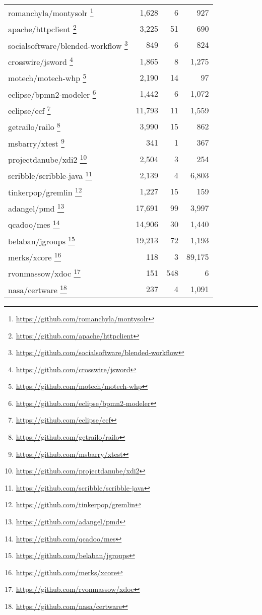 \documentclass[3p]{elsarticle}
\begin{document}
\begin{table}[h]
\begin{tabular}{|l|r|r|r|}
romanchyla/montysolr	 \footnote{\url{https://github.com/romanchyla/montysolr}} & 1,628 & 6 & 927   \\
apache/httpclient	 \footnote{\url{https://github.com/apache/httpclient}} & 3,225 & 51 &  690  \\
socialsoftware/blended-workflow	 \footnote{\url{https://github.com/socialsoftware/blended-workflow}} & 849 & 6&  824 \\
crosswire/jsword	 \footnote{\url{https://github.com/crosswire/jsword}} & 1,865 & 8 & 1,275 \\
motech/motech-whp	 \footnote{\url{https://github.com/motech/motech-whp}} & 2,190 & 14 &  97  \\
eclipse/bpmn2-modeler	 \footnote{\url{https://github.com/eclipse/bpmn2-modeler}} & 1,442 & 6 & 1,072\\
eclipse/ecf	 \footnote{\url{https://github.com/eclipse/ecf}} & 11,793 & 11 & 1,559   \\
getrailo/railo	 \footnote{\url{https://github.com/getrailo/railo}} & 3,990 & 15 & 862 \\
msbarry/xtest	 \footnote{\url{https://github.com/msbarry/xtest}} & 341 & 1 & 367   \\
projectdanube/xdi2	 \footnote{\url{https://github.com/projectdanube/xdi2}} & 2,504 & 3 & 254 \\
scribble/scribble-java	 \footnote{\url{https://github.com/scribble/scribble-java}} & 2,139 & 4 & 6,803 \\
tinkerpop/gremlin	 \footnote{\url{https://github.com/tinkerpop/gremlin}} & 1,227 & 15 &  159 \\
adangel/pmd	 \footnote{\url{https://github.com/adangel/pmd}} & 17,691 & 99 & 3,997  \\
qcadoo/mes	 \footnote{\url{https://github.com/qcadoo/mes}} & 14,906 & 30 & 1,440  \\
belaban/jgroups	 \footnote{\url{https://github.com/belaban/jgroups}} & 19,213 & 72 & 1,193  \\
merks/xcore \footnote{\url{https://github.com/merks/xcore}} & 118 & 3 &  89,175   \\
rvonmassow/xdoc	 \footnote{\url{https://github.com/rvonmassow/xdoc}} & 151 & 548 & 6
   \\
nasa/certware	 \footnote{\url{https://github.com/nasa/certware}} & 237 & 4 & 1,091   \\


     \hline
    \end{tabular}
    
    \label{tab:Studied Projects_30projects}
\end{table}
\end{document}
